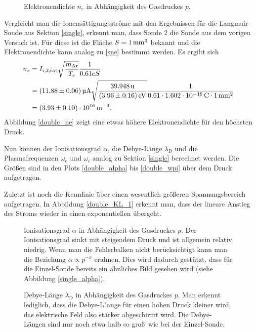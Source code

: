 \begin{figure}[htbp]
    \centering
    
    \caption{
        Elektronendichte $n_e$ in Abh\"angigkeit des Gasdruckes $p$.
    }
    \label{double_ne}
\end{figure}

Vergleicht man die Ionens\"attigungsstr\"ome mit den Ergebnissen f\"ur die Langmuir-Sonde aus Sektion \ref{single}, erkennt man, dass Sonde 2 die Sonde aus dem vorigen Versuch ist.
F\"ur diese ist die Fl\"ache $S=\SI{1}{\milli\metre\squared}$ bekannt und die Elektronendichte kann analog zu \eqref{sne} bestimmt werden.
Es ergibt sich
\begin{align}
n_e
    &=I_{i,2,\text{sat}}\sqrt{\frac{m_\text{Ar}}{T_e}}\frac{1}{0.61eS}\label{sne}\\
    &=\siBIibsata\sqrt{\frac{\simAr}{\siBTea}}\frac{1}{0.61\cdot \sie \cdot\siS}\nonumber\\
    &=\siBnea .\nonumber
\end{align}
Abbildung \vref{double_ne} zeigt eine etwas h\"ohere Elektronendichte f\"ur den h\"ochsten Druck.

Nun k\"onnen der Ionisationsgrad $\alpha$, die Debye-L\"ange $\lambda_\text{D}$ und die Plasmafrequenzen $\omega_e$ und $\omega_i$ analog zu Sektion \ref{single} berechnet werden.
Die Gr\"o\ss en sind in den Plots \vref{double_alpha} bis \vref{double_wpi} \"uber dem Druck aufgetragen.

Zuletzt ist noch die Kennlinie \"uber einen wesentlich gr\"o\ss eren Spannungsbereich aufgetragen.
In Abbildung \vref{double_KL_1} erkennt man, dass der lineare Anstieg des Stroms wieder in einen exponentiellen \"ubergeht.

\begin{figure}[htbp]
    \centering
    
    \caption{
        Ionisationsgrad $\alpha$ in Abh\"angigkeit des Gasdruckes $p$.
        Der Ionisationsgrad sinkt mit steigendem Druck und ist allgemein relativ niedrig.
        Wenn man die Fehlerbalken nicht ber\"ucksichtigt kann man die Beziehung $\alpha\propto p^{-x}$ erahnen.
        Dies wird dadurch gest\"utzt, dass f\"ur die Einzel-Sonde bereits ein \"ahnliches Bild gesehen wird (siehe Abbildung \vref{single_alpha}).
    }
    \label{double_alpha}
\end{figure}

\begin{figure}[htbp]
    \centering
    
    \caption{
        Debye-L\"ange $\lambda_\text{D}$ in Abh\"angigkeit des Gasdruckes $p$.
        Man erkennt lediglich, dass die Debye-L"ange f\"ur einen hohen Druck kleiner wird, das elektrische Feld also st\"arker abgeschirmt wird.
        Die Debye-L\"angen sind nur noch etwa halb so gro\ss\ wie bei der Einzel-Sonde.
    }
    \label{double_deb}
\end{figure}

